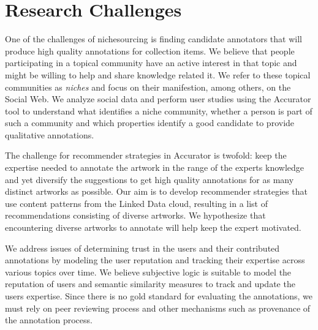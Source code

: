 \section{Research Challenges}
\label{use_case}

One of the challenges of nichesourcing is finding candidate annotators that will produce high quality annotations for collection items. 
We believe that people participating in a topical community have an active interest in that topic and might be willing to help and share knowledge related it. We refer to these topical communities as \textit{niches} and focus on their manifestion, among others, on the Social Web. We analyze social data and perform user studies using the Accurator tool to understand what identifies a niche community, whether a person is part of such a community and which properties identify a good candidate to provide qualitative annotations. 

The challenge for recommender strategies in Accurator is twofold: keep the expertise needed to annotate the artwork in the range of the experts knowledge and yet diversify the suggestions to get high quality annotations for as many distinct artworks as possible. 
Our aim is to develop recommender strategies that use content patterns from the Linked Data cloud, resulting in a list of recommendations consisting of diverse artworks. 
We hypothesize that encountering diverse artworks to annotate will help keep the expert motivated.

We address issues of determining trust in the users and their contributed annotations by modeling the user reputation and tracking their expertise across various topics over time. We believe subjective logic is suitable to model the reputation of users and semantic similarity measures to track and update the users expertise. Since there is no gold standard for evaluating the annotations, we must rely on peer reviewing process and other mechanisms such as provenance of the annotation process.

